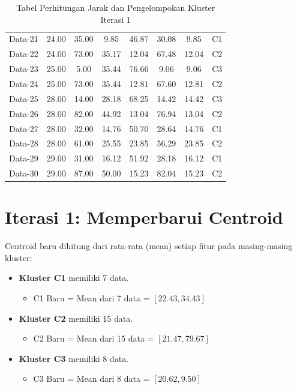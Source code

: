 \documentclass[12pt, a4paper]{article}
\begin{document}
\begin{table}[H]
{\begin{tabular}{|c|c|c|c|c|c|c|c|}
        Data-21 & 24.00 & 35.00 & 9.85  & 46.87 & 30.08 & 9.85  & C1 \\
        Data-22 & 24.00 & 73.00 & 35.17 & 12.04 & 67.48 & 12.04 & C2 \\
        Data-23 & 25.00 & 5.00  & 35.44 & 76.66 & 9.06  & 9.06  & C3 \\
        Data-24 & 25.00 & 73.00 & 35.44 & 12.81 & 67.60 & 12.81 & C2 \\
        Data-25 & 28.00 & 14.00 & 28.18 & 68.25 & 14.42 & 14.42 & C3 \\
        Data-26 & 28.00 & 82.00 & 44.92 & 13.04 & 76.94 & 13.04 & C2 \\
        Data-27 & 28.00 & 32.00 & 14.76 & 50.70 & 28.64 & 14.76 & C1 \\
        Data-28 & 28.00 & 61.00 & 25.55 & 23.85 & 56.29 & 23.85 & C2 \\
        Data-29 & 29.00 & 31.00 & 16.12 & 51.92 & 28.18 & 16.12 & C1 \\
        Data-30 & 29.00 & 87.00 & 50.00 & 15.23 & 82.04 & 15.23 & C2 \\
        \hline
    \end{tabular}
    }
    \caption{Tabel Perhitungan Jarak dan Pengelompokan Kluster Iterasi 1}
\end{table}

\section{Iterasi 1: Memperbarui Centroid}
Centroid baru dihitung dari rata-rata (mean) setiap fitur pada masing-masing kluster:
\begin{itemize}
    \item \textbf{Kluster C1} memiliki 7 data.
    \begin{itemize}
        \item C1 Baru = Mean dari 7 data = $[22.43, 34.43]$
    \end{itemize}
    \item \textbf{Kluster C2} memiliki 15 data.
    \begin{itemize}
        \item C2 Baru = Mean dari 15 data = $[21.47, 79.67]$
    \end{itemize}
    \item \textbf{Kluster C3} memiliki 8 data.
    \begin{itemize}
        \item C3 Baru = Mean dari 8 data = $[20.62, 9.50]$
    \end{itemize}
\end{itemize}
\end{document}
